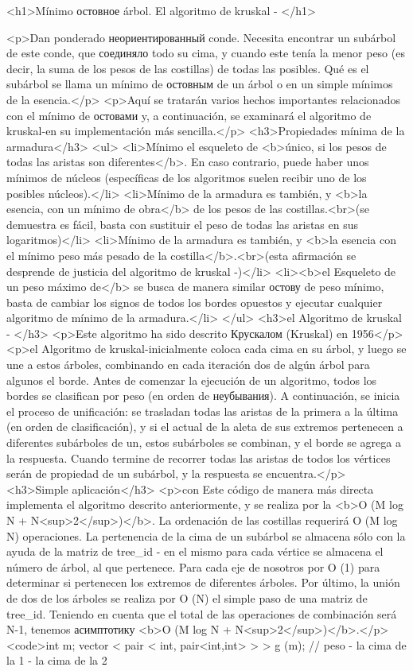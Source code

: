 <h1>Mínimo остовное árbol. El algoritmo de kruskal - </h1>

<p>Dan ponderado неориентированный conde. Necesita encontrar un subárbol de este conde, que соединяло todo su cima, y cuando este tenía la menor peso (es decir, la suma de los pesos de las costillas) de todas las posibles. Qué es el subárbol se llama un mínimo de остовным de un árbol o en un simple mínimos de la esencia.</p>
<p>Aquí se tratarán varios hechos importantes relacionados con el mínimo de остовами y, a continuación, se examinará el algoritmo de kruskal-en su implementación más sencilla.</p>
<h3>Propiedades mínima de la armadura</h3>
<ul>
<li>Mínimo el esqueleto de <b>único, si los pesos de todas las aristas son diferentes</b>. En caso contrario, puede haber unos mínimos de núcleos (específicas de los algoritmos suelen recibir uno de los posibles núcleos).</li>
<li>Mínimo de la armadura es también, y <b>la esencia, con un mínimo de obra</b> de los pesos de las costillas.<br>(se demuestra es fácil, basta con sustituir el peso de todas las aristas en sus logaritmos)</li>
<li>Mínimo de la armadura es también, y <b>la esencia con el mínimo peso más pesado de la costilla</b>.<br>(esta afirmación se desprende de justicia del algoritmo de kruskal -)</li>
<li><b>el Esqueleto de un peso máximo de</b> se busca de manera similar остову de peso mínimo, basta de cambiar los signos de todos los bordes opuestos y ejecutar cualquier algoritmo de mínimo de la armadura.</li>
</ul>
<h3>el Algoritmo de kruskal - </h3>
<p>Este algoritmo ha sido descrito Крускалом (Kruskal) en 1956</p>
<p>el Algoritmo de kruskal-inicialmente coloca cada cima en su árbol, y luego se une a estos árboles, combinando en cada iteración dos de algún árbol para algunos el borde. Antes de comenzar la ejecución de un algoritmo, todos los bordes se clasifican por peso (en orden de неубывания). A continuación, se inicia el proceso de unificación: se trasladan todas las aristas de la primera a la última (en orden de clasificación), y si el actual de la aleta de sus extremos pertenecen a diferentes subárboles de un, estos subárboles se combinan, y el borde se agrega a la respuesta. Cuando termine de recorrer todas las aristas de todos los vértices serán de propiedad de un subárbol, y la respuesta se encuentra.</p>
<h3>Simple aplicación</h3>
<p>con Este código de manera más directa implementa el algoritmo descrito anteriormente, y se realiza por la <b>O (M log N + N<sup>2</sup>)</b>. La ordenación de las costillas requerirá O (M log N) operaciones. La pertenencia de la cima de un subárbol se almacena sólo con la ayuda de la matriz de tree_id - en el mismo para cada vértice se almacena el número de árbol, al que pertenece. Para cada eje de nosotros por O (1) para determinar si pertenecen los extremos de diferentes árboles. Por último, la unión de dos de los árboles se realiza por O (N) el simple paso de una matriz de tree_id. Teniendo en cuenta que el total de las operaciones de combinación será N-1, tenemos асимптотику <b>O (M log N + N<sup>2</sup>)</b>.</p>
<code>int m;
vector < pair < int, pair<int,int> > > g (m); // peso - la cima de la 1 - la cima de la 2

